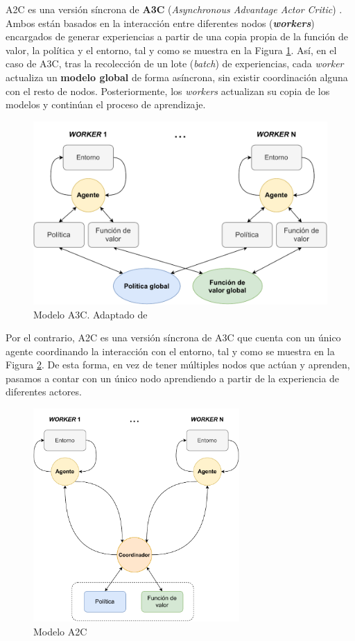A2C es una versión síncrona de \textbf{A3C} (\textit{Asynchronous Advantage Actor Critic}) \cite{mnih2016asynchronous}. Ambos están basados en la interacción entre diferentes nodos (\textit{\textbf{workers}}) encargados de generar experiencias a partir de una copia propia de la función de valor, la política y el entorno, tal y como se muestra en la Figura \ref{fig:a3c}. Así, en el caso de A3C, tras la recolección de un lote (\textit{batch}) de experiencias, cada \textit{worker} actualiza un \textbf{modelo global} de forma asíncrona, sin existir coordinación alguna con el resto de nodos. Posteriormente, los \textit{workers} actualizan su copia de los modelos y continúan el proceso de aprendizaje.

\begin{figure}
    \centering
    \includegraphics[width=\textwidth]{imagenes/A3C.pdf}
    \caption{Modelo A3C. Adaptado de \cite{morales2020grokking}}
    \label{fig:a3c}
\end{figure}

Por el contrario, A2C es una versión síncrona de A3C que cuenta con un único agente coordinando la interacción con el entorno, tal y como se muestra en la Figura \ref{fig:a2c}. De esta forma, en vez de tener múltiples nodos que actúan y aprenden, pasamos a contar con un único nodo aprendiendo a partir de la experiencia de diferentes actores.

\begin{figure}
    \centering
    \includegraphics[width=0.7\textwidth]{imagenes/A2C.pdf}
    \caption{Modelo A2C}
    \label{fig:a2c}
\end{figure}

